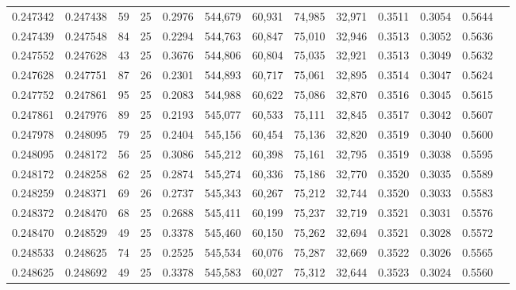 \begin{tabular}{rrrrrrrrrrrrr}
0.247342 & 0.247438 &    59 &  25 &                                     0.2976 & 544,679 &  60,931 &  74,985 &  32,971 & 0.3511 & 0.3054 & 0.5644 \\
0.247439 & 0.247548 &    84 &  25 &                                     0.2294 & 544,763 &  60,847 &  75,010 &  32,946 & 0.3513 & 0.3052 & 0.5636 \\
0.247552 & 0.247628 &    43 &  25 &                                     0.3676 & 544,806 &  60,804 &  75,035 &  32,921 & 0.3513 & 0.3049 & 0.5632 \\
0.247628 & 0.247751 &    87 &  26 &                                     0.2301 & 544,893 &  60,717 &  75,061 &  32,895 & 0.3514 & 0.3047 & 0.5624 \\
0.247752 & 0.247861 &    95 &  25 &                                     0.2083 & 544,988 &  60,622 &  75,086 &  32,870 & 0.3516 & 0.3045 & 0.5615 \\
0.247861 & 0.247976 &    89 &  25 &                                     0.2193 & 545,077 &  60,533 &  75,111 &  32,845 & 0.3517 & 0.3042 & 0.5607 \\
0.247978 & 0.248095 &    79 &  25 &                                     0.2404 & 545,156 &  60,454 &  75,136 &  32,820 & 0.3519 & 0.3040 & 0.5600 \\
0.248095 & 0.248172 &    56 &  25 &                                     0.3086 & 545,212 &  60,398 &  75,161 &  32,795 & 0.3519 & 0.3038 & 0.5595 \\
0.248172 & 0.248258 &    62 &  25 &                                     0.2874 & 545,274 &  60,336 &  75,186 &  32,770 & 0.3520 & 0.3035 & 0.5589 \\
0.248259 & 0.248371 &    69 &  26 &                                     0.2737 & 545,343 &  60,267 &  75,212 &  32,744 & 0.3520 & 0.3033 & 0.5583 \\
0.248372 & 0.248470 &    68 &  25 &                                     0.2688 & 545,411 &  60,199 &  75,237 &  32,719 & 0.3521 & 0.3031 & 0.5576 \\
0.248470 & 0.248529 &    49 &  25 &                                     0.3378 & 545,460 &  60,150 &  75,262 &  32,694 & 0.3521 & 0.3028 & 0.5572 \\
0.248533 & 0.248625 &    74 &  25 &                                     0.2525 & 545,534 &  60,076 &  75,287 &  32,669 & 0.3522 & 0.3026 & 0.5565 \\
0.248625 & 0.248692 &    49 &  25 &                                     0.3378 & 545,583 &  60,027 &  75,312 &  32,644 & 0.3523 & 0.3024 & 0.5560 \\

\end{tabular}
